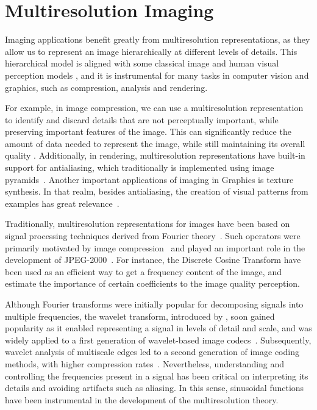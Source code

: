 \chapter{Multiresolution Imaging}
\label{ch:imaging}

Imaging applications benefit greatly from multiresolution representations, as they allow us to represent an image hierarchically at different levels of details. This hierarchical model is aligned with some classical image and human visual perception models \citep{marr82}, and it is instrumental for many tasks in computer vision and graphics, such as compression, analysis and rendering. 

For example, in image compression, we can use a multiresolution representation to identify and discard details that are not perceptually important, while preserving important features of the image. This can significantly reduce the amount of data needed to represent the image, while still maintaining its overall quality \citep{burt1987laplacian}. Additionally, in rendering, multiresolution representations have built-in support for antialiasing, which traditionally is implemented using image pyramids~\cite{mipmap83}. Another important applications of imaging in Graphics is texture synthesis. In that realm, besides antialiasing, the creation of visual patterns from examples has great relevance~\cite{thies19}.

Traditionally, multiresolution representations for images have been based on signal processing techniques derived from Fourier theory~\cite{bracewell1986fourier}. Such operators were primarily motivated by image compression~\cite{bhaskaran1997image} and played an important role in the development of JPEG-2000~\cite{marcellin2000overview}. For instance, the Discrete Cosine Transform \cite{dct-og} have been  used as an efficient way to get a frequency content of the image, and estimate the importance of certain coefficients to the image quality perception. 

Although Fourier transforms were initially popular for decomposing signals into multiple frequencies, the wavelet transform, introduced by \citet{mallat1989theory}, soon gained popularity as it enabled representing a signal in levels of detail and scale, and was widely applied to a first generation of wavelet-based image codecs~\cite{antonini1992image}. Subsequently, wavelet analysis of multiscale edges led to a second generation of image coding methods, with higher compression rates~\cite{mallat-2gen}. Nevertheless, understanding and controlling the frequencies present in a signal has been critical on interpreting its details and avoiding artifacts such as aliasing. In this sense, sinusoidal functions have been instrumental in the development of the multiresolution theory.

